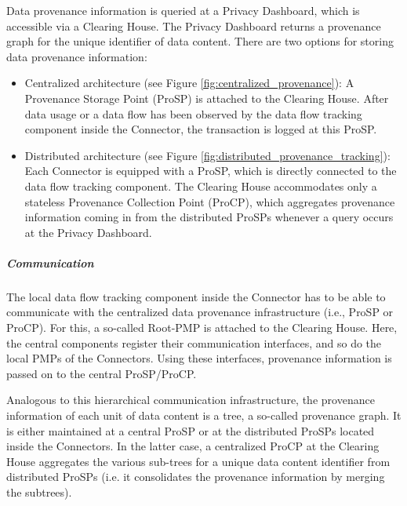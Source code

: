 
Data provenance information is queried at a Privacy Dashboard, which is accessible via a Clearing House. The Privacy Dashboard returns a provenance graph for the unique identifier of data content. There are two options for storing data provenance information:


\begin{itemize}
	\item Centralized architecture (see Figure \ref{fig:centralized_provenance}): A Provenance Storage Point (ProSP) is attached to the Clearing House. After data usage or a data flow has been observed by the data flow tracking component inside the Connector, the transaction is logged at this ProSP.

	\item Distributed architecture (see Figure \ref{fig:distributed_provenance_tracking}): Each Connector is equipped with a ProSP, which is directly connected to the data flow tracking component. The Clearing House accommodates only a stateless Provenance Collection Point (ProCP), which aggregates provenance information coming in from the distributed ProSPs whenever a query occurs at the Privacy Dashboard.
\end{itemize}


\subparagraph*{Communication\\}
The local data flow tracking component inside the  Connector has to be able to communicate with the centralized data provenance infrastructure (i.e., ProSP or ProCP). For this, a so-called Root-PMP is attached to the Clearing House. Here, the central components register their communication interfaces, and so do the local PMPs of the Connectors. Using these interfaces, provenance information is passed on to the central ProSP/ProCP.

Analogous to this hierarchical communication infrastructure, the provenance information of each unit of data content is a tree, a so-called provenance graph. It is either maintained at a central ProSP or at the distributed ProSPs located inside the Connectors. In the latter case, a centralized ProCP at the Clearing House aggregates the various sub-trees for a unique data content identifier from distributed ProSPs (i.e. it consolidates the provenance information by merging the subtrees).


